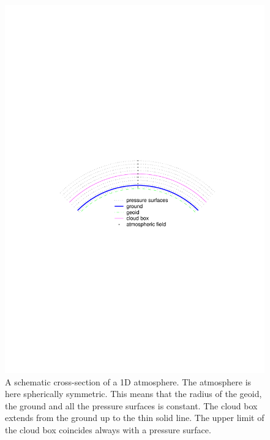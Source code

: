  \begin{figure}[!t]
  \begin{center}
   \includegraphics*[width=0.95\hsize]{Figs/atm_dim_1d}
   \caption{ A schematic cross-section of a 1D atmosphere. The atmosphere is 
     here spherically symmetric. This means that the radius of the
     geoid, the ground and all the pressure surfaces is constant. The
     cloud box extends from the ground up to the thin solid line. The
     upper limit of the cloud box coincides always with a pressure
     surface.  }
   \label{fig:fm_defs:1d}  
  \end{center}
 \end{figure}

